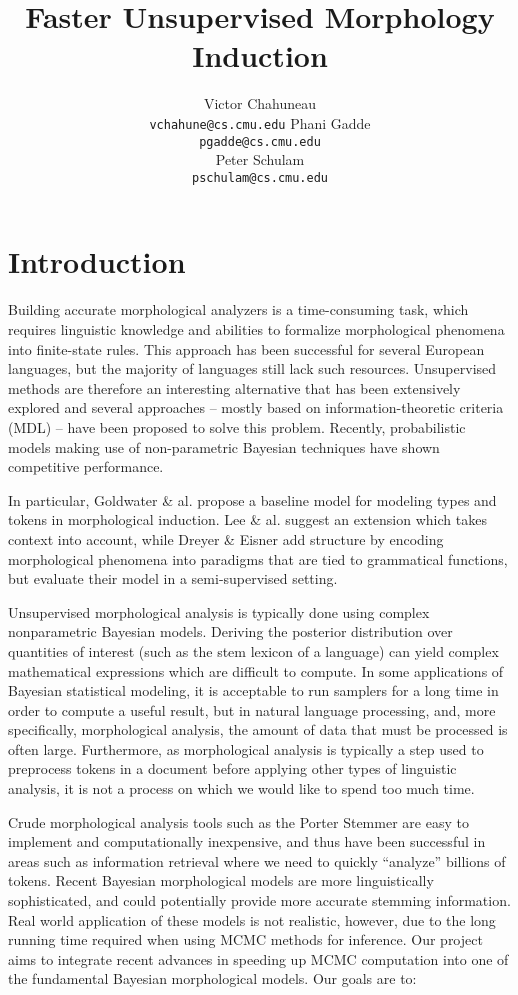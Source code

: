 \documentclass{article}
\title{Faster Unsupervised Morphology Induction}
\author{
Victor Chahuneau\\
\texttt{vchahune@cs.cmu.edu}
\And
Phani Gadde\\
\texttt{pgadde@cs.cmu.edu} \\
\And
Peter Schulam\\
\texttt{pschulam@cs.cmu.edu}
}
\begin{document}
\maketitle

\section{Introduction}

Building accurate morphological analyzers is a time-consuming task,
which requires linguistic knowledge and abilities to formalize
morphological phenomena into finite-state rules. This approach has
been successful for several European languages, but the majority of
languages still lack such resources. Unsupervised methods are
therefore an interesting alternative that has been extensively
explored and several approaches -- mostly based on
information-theoretic criteria (MDL) -- have been proposed to solve
this problem. Recently, probabilistic models making use of
non-parametric Bayesian techniques have shown competitive performance.

In particular, Goldwater \& al. \cite{goldwater2011} propose a
baseline model for modeling types and tokens in morphological
induction. Lee \& al. \cite{lee2011} suggest an extension which takes
context into account, while Dreyer \& Eisner \cite{dreyer2011} add
structure by encoding morphological phenomena into paradigms that are
tied to grammatical functions, but evaluate their model in a
semi-supervised setting.

Unsupervised morphological analysis is typically done using complex
nonparametric Bayesian models. Deriving the posterior distribution
over quantities of interest (such as the stem lexicon of a language)
can yield complex mathematical expressions which are difficult to
compute. In some applications of Bayesian statistical modeling, it is
acceptable to run samplers for a long time in order to compute a
useful result, but in natural language processing, and, more
specifically, morphological analysis, the amount of data that must be
processed is often large. Furthermore, as morphological analysis is
typically a step used to preprocess tokens in a document before
applying other types of linguistic analysis, it is not a process on
which we would like to spend too much time.

Crude morphological analysis tools such as the Porter Stemmer are easy
to implement and computationally inexpensive, and thus have been
successful in areas such as information retrieval where we need to
quickly ``analyze'' billions of tokens. Recent Bayesian morphological
models are more linguistically sophisticated, and could potentially
provide more accurate stemming information. Real world application of
these models is not realistic, however, due to the long running time
required when using MCMC methods for inference. Our project aims to
integrate recent advances in speeding up MCMC computation into one of
the fundamental Bayesian morphological models. Our goals are to:
\end{document}
